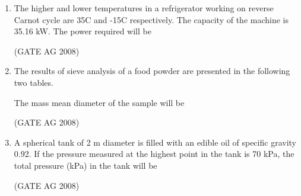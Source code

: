 \documentclass[journal,12pt,onecolumn]{IEEEtran}
\begin{document}
\begin{enumerate}
\medskip

\item 
 The higher and lower temperatures in a refrigerator working on reverse Carnot cycle are 35\textdegree C and -15\textdegree C respectively. The capacity of the machine is 35.16 kW. The power required will be
\begin{enumerate}
\end{enumerate}
\hfill(GATE AG 2008)\\

\medskip

\item 
 The results of sieve analysis of a food powder are presented in the following two tables.


\medskip



The mass mean diameter of the sample will be
\begin{enumerate}
\end{enumerate}
\hfill(GATE AG 2008)\\

\medskip

\item 
 A spherical tank of 2 m diameter is filled with an edible oil of specific gravity 0.92. If the pressure measured at the highest point in the tank is 70 kPa, the total pressure (kPa) in the tank will be
\begin{enumerate}
\end{enumerate}
\hfill(GATE AG 2008)\\


\end{enumerate}
\end{document}
